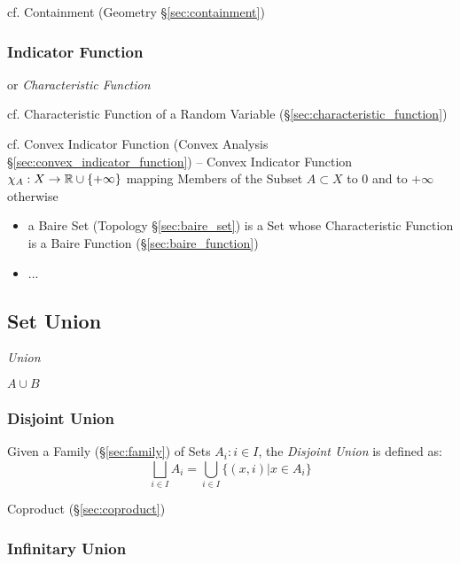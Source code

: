 \fist cf. Containment (Geometry \S\ref{sec:containment})



\subsubsection{Indicator Function}\label{sec:indicator_function}

or \emph{Characteristic Function}

\fist cf. Characteristic Function of a Random Variable
(\S\ref{sec:characteristic_function})

\fist cf. Convex Indicator Function (Convex Analysis
\S\ref{sec:convex_indicator_function}) -- Convex Indicator Function
$\chi_A : X \to \mathbb{R} \cup \{ +\infty \}$ mapping Members of the
Subset $A \subset X$ to $0$ and to $+\infty$ otherwise

\begin{itemize}
  \item a Baire Set (Topology \S\ref{sec:baire_set}) is a Set whose
    Characteristic Function is a Baire Function (\S\ref{sec:baire_function})
  \item ...
\end{itemize}



\subsection{Set Union}\label{sec:set_union}

\emph{Union}

$A \cup B$



\subsubsection{Disjoint Union}\label{sec:disjoint_union}

Given a Family (\S\ref{sec:family}) of Sets ${A_i : i \in I}$,
the \emph{Disjoint Union} is defined as:
\[
  \bigsqcup_{i \in I} A_i = \bigcup_{i \in I} \{(x,i) | x \in A_i \}
\]

Coproduct (\S\ref{sec:coproduct})



\subsubsection{Infinitary Union}\label{sec:infinitary_union}

